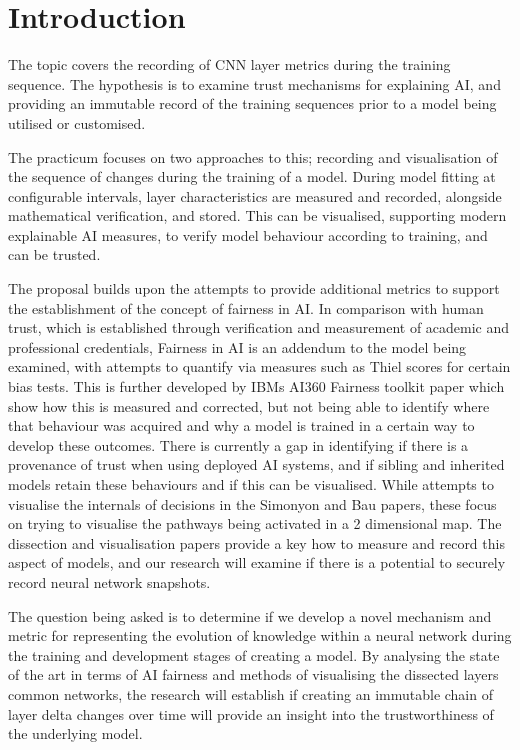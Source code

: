 \section{Introduction}

The topic covers the recording of CNN layer metrics during the training
sequence. The hypothesis is to examine trust mechanisms for explaining AI, and
providing an immutable record of the training sequences prior to a model being
utilised or customised.

The practicum focuses on two approaches to this;
recording and visualisation of the sequence of changes during the training of a
model. During model fitting at configurable intervals, layer characteristics are
measured and recorded, alongside mathematical verification, and stored. This can
be visualised, supporting modern explainable AI measures, to verify model
behaviour according to training, and can be trusted.

The proposal builds upon the attempts to provide additional metrics to support
the establishment of the concept of fairness in AI. In comparison with human
trust, which is established through verification and measurement of academic and
professional credentials, Fairness in AI is an addendum to the model being
examined, with attempts to quantify via measures such as Thiel scores for
certain bias tests. This is further developed by IBMs AI360 Fairness toolkit
paper which show how this is measured and corrected, but not being able to
identify where that behaviour was acquired and why a model is trained in a
certain way to develop these outcomes.
 There is currently a gap in identifying
if there is a provenance of trust when using deployed AI systems, and if sibling
and inherited models retain these behaviours and if this can be visualised.
While attempts to visualise the internals of decisions in the Simonyon and Bau
papers, these focus on trying to visualise the pathways being activated in a 2
dimensional map. The dissection and visualisation papers provide a key how to
measure and record this aspect of models, and our research will examine if there
is a potential to securely record neural network snapshots.
 
 The question being asked is to determine if we develop a novel mechanism and metric for
representing the evolution of knowledge within a neural network during the
training and development stages of creating a model. By analysing the state of
the art in terms of AI fairness and methods of visualising the dissected layers
common networks, the research will establish if creating an immutable chain of
layer delta changes over time will provide an insight into the trustworthiness
of the underlying model.

